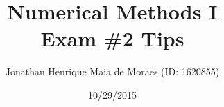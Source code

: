 \title{Numerical Methods I \\ Exam \#2 Tips}
\author{Jonathan Henrique Maia de Moraes (ID: 1620855)}
\date{10/29/2015}
\maketitle
